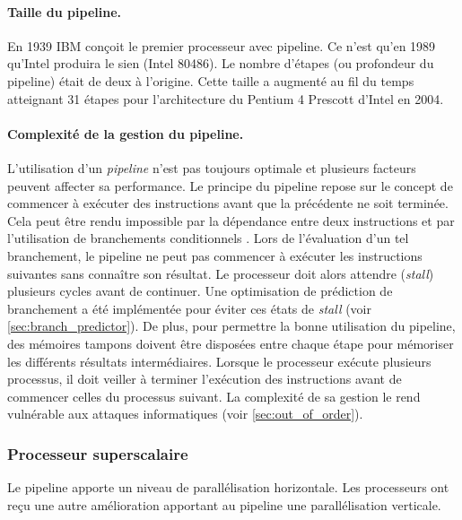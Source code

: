 \paragraph{Taille du pipeline.}
En 1939 IBM conçoit le premier processeur avec pipeline. Ce n'est qu'en 1989 qu'Intel produira le sien (Intel 80486). Le nombre d'étapes (ou profondeur du pipeline) était de deux à l'origine. Cette taille a augmenté au fil du temps atteignant 31 étapes pour l'architecture du Pentium 4 Prescott d'Intel en 2004. 

\paragraph{Complexité de la gestion du pipeline.}
L'utilisation d'un \textit{pipeline} n'est pas toujours optimale et plusieurs facteurs peuvent affecter sa performance. Le principe du pipeline repose sur le concept de commencer à exécuter des instructions avant que la précédente ne soit terminée. Cela peut être rendu impossible par la dépendance entre deux instructions et par l'utilisation de branchements conditionnels \cite{emma1987characterization}. Lors de l'évaluation d'un tel branchement, le pipeline ne peut pas commencer à exécuter les instructions suivantes sans connaître son résultat. Le processeur doit alors attendre (\textit{stall}) plusieurs cycles avant de continuer. Une optimisation de prédiction de branchement a été implémentée pour éviter ces états de \textit{stall} (voir \autoref{sec:branch_predictor}). De plus, pour permettre la bonne utilisation du pipeline, des mémoires tampons doivent être disposées entre chaque étape pour mémoriser les différents résultats intermédiaires. Lorsque le processeur exécute plusieurs processus, il doit veiller à terminer l'exécution des instructions avant de commencer celles du processus suivant. La complexité de sa gestion le rend vulnérable aux attaques informatiques (voir \autoref{sec:out_of_order}). 













\subsubsection{Processeur superscalaire} \label{sec:superscalar}

Le pipeline apporte un niveau de parallélisation horizontale. Les processeurs ont reçu une autre amélioration apportant au pipeline une parallélisation verticale. 

